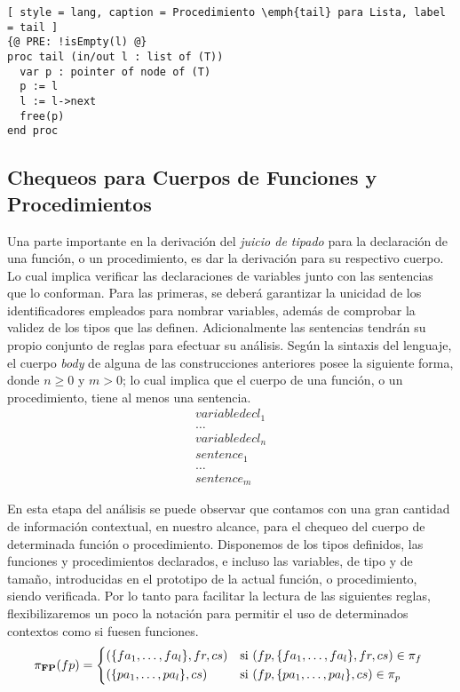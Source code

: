 \begin{lstlisting}[ style = lang, caption = Procedimiento \emph{tail} para Lista, label = tail ]
{@ PRE: !isEmpty(l) @}
proc tail (in/out l : list of (T))
  var p : pointer of node of (T)
  p := l
  l := l->next
  free(p)
end proc
\end{lstlisting}

\subsection{Chequeos para Cuerpos de Funciones y Procedimientos}

Una parte importante en la derivación del \textit{juicio de tipado} para la declaración de una función, o un procedimiento, es dar la derivación para su respectivo cuerpo.
Lo cual implica verificar las declaraciones de variables junto con las sentencias que lo conforman.
Para las primeras, se deberá garantizar la unicidad de los identificadores empleados para nombrar variables, además de comprobar la validez de los tipos que las definen.
Adicionalmente las sentencias tendrán su propio conjunto de reglas para efectuar su análisis.
Según la sintaxis del lenguaje, el cuerpo \textit{body} de alguna de las construcciones anteriores posee la siguiente forma, donde $n \geq 0$ y $m > 0$; lo cual implica que el cuerpo de una función, o un procedimiento, tiene al menos una sentencia.
\begin{gather*}
variabledecl_1
\\
\ldots
\\
variabledecl_n
\\
sentence_1
\\
\ldots
\\
sentence_m
\end{gather*}

En esta etapa del análisis se puede observar que contamos con una gran cantidad de información contextual, en nuestro alcance, para el chequeo del cuerpo de determinada función o procedimiento.
Disponemos de los tipos definidos, las funciones y procedimientos declarados, e incluso las variables, de tipo y de tamaño, introducidas en el prototipo de la actual función, o procedimiento, siendo verificada.
Por lo tanto para facilitar la lectura de las siguientes reglas, flexibilizaremos un poco la notación para permitir el uso de determinados contextos como si fuesen funciones.
\begin{align*}
\PI{FP}(fp) =
\begin{cases*}
(\{ fa_1, \ldots, fa_l \}, fr, cs )
&
si $(fp, \{ fa_1, \ldots, fa_l \}, fr, cs ) \in \pi_{f}$
\\
(\{ pa_1, \ldots, pa_l \}, cs )
&
si $(fp, \{ pa_1, \ldots, pa_l \}, cs ) \in \pi_{p}$
\end{cases*}
\end{align*}


